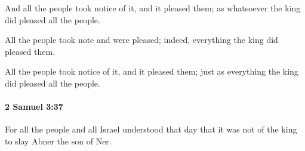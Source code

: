 			\begin{versebox}
					\item[BHS] 
					\item[ASV] And all the people took notice of it, and it pleased them; as whatsoever the king did pleased all the people.
					\item[NIV] All the people took note and were pleased; indeed, everything the king did pleased them.
					\item[NRSV] All the people took notice of it, and it pleased them; just as everything the king did pleased all the people.
			\end{versebox}

		\paragraph{2 Samuel 3:37} %
			\label{2SAMUEL-3-37}

			For all the people and all Israel understood that day that it was not of the king to slay Abner the son of Ner.

